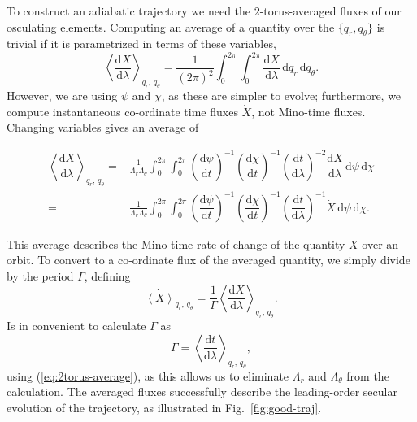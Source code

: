 \documentclass[aps,prd,amsfonts,amssymb,amsmath,nofootinbib,showpacs,superscriptaddress,twocolumn]{revtex4}
\newcommand{\eqnref}[1]{(\ref{eq:#1})}
\newcommand{\figref}[1]{Fig.\ \ref{fig:#1}}
\newcommand{\dd}{\ensuremath{\mathrm{d}}}
\newcommand{\diff}[2]{\ensuremath{\dfrac{\dd {#1}}{\dd {#2}}}}
\newcommand{\intd}[4]{\ensuremath{\int_{#1}^{#2}{#3}\,\dd{#4}}}
\begin{document}
To construct an adiabatic trajectory we need the $2$-torus-averaged fluxes of our osculating elements. Computing an average of a quantity over the $\{q_r, q_\theta\}$ is trivial if it is parametrized in terms of these variables,
\begin{equation}
\left\langle \diff{X}{\lambda}\right\rangle_{q_r,\,q_\theta} = \frac{1}{(2\pi)^2}\intd{0}{2\pi}{\intd{0}{2\pi}{\diff{X}{\lambda}}{q_r}}{q_\theta}.
\end{equation}
However, we are using $\psi$ and $\chi$, as these are simpler to evolve; furthermore, we compute instantaneous co-ordinate time fluxes $\dot{X}$, not Mino-time fluxes. Changing variables gives an average of \cite{Drasco2005}
\begin{widetext}\begin{align}
\left\langle \diff{X}{\lambda}\right\rangle_{q_r,\,q_\theta} = {} & \frac{1}{\Lambda_r \Lambda_\theta}\intd{0}{2\pi}{\intd{0}{2\pi}{\left(\diff{\psi}{t}\right)^{-1} \left(\diff{\chi}{t}\right)^{-1} \left(\diff{t}{\lambda}\right)^{-2} \diff{X}{\lambda}}{\psi}}{\chi} \\
 = {} & \frac{1}{\Lambda_r \Lambda_\theta}\intd{0}{2\pi}{\intd{0}{2\pi}{\left(\diff{\psi}{t}\right)^{-1} \left(\diff{\chi}{t}\right)^{-1} \left(\diff{t}{\lambda}\right)^{-1} \dot{X}}{\psi}}{\chi}.
\label{eq:2torus-average}
\end{align}\end{widetext}
This average describes the Mino-time rate of change of the quantity $X$ over an orbit. To convert to a co-ordinate flux of the averaged quantity, we simply divide by the period $\Gamma$, defining
\begin{equation}
\dot{\left\langle X\right\rangle}_{q_r,\,q_\theta} = \frac{1}{\Gamma}\left\langle \diff{X}{\lambda}\right\rangle_{q_r,\,q_\theta}.
\end{equation}
Is in convenient to calculate $\Gamma$ as
\begin{equation}
\Gamma = \left\langle \diff{t}{\lambda}\right\rangle_{q_r,\,q_\theta},
\end{equation}
using \eqnref{2torus-average}, as this allows us to eliminate $\Lambda_r$ and $\Lambda_\theta$ from the calculation. The averaged fluxes successfully describe the leading-order secular evolution of the trajectory, as illustrated in \figref{good-traj}.
\end{document}
